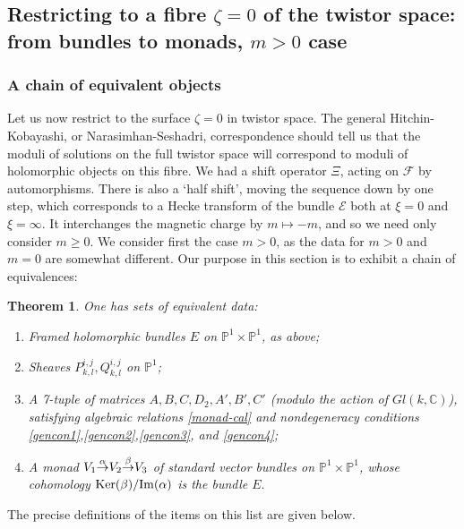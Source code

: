 \documentclass[12pt]{article}
\newtheorem{theorem}{Theorem}[section]
\theoremstyle{definition}
\theoremstyle{remark}
\numberwithin{theorem}{section}
\def\bC{{\mathbb {C}}}
\def\bP{{\mathbb {P}}}
\def\pE{{\mathcal E}}
\def\pF{{\mathcal F}}
\renewcommand{\ker}{\mathop{\mathrm{Ker}}\nolimits}
\begin{document}
 


\subsection{Restricting to a fibre $\zeta = 0$ of the twistor space: from bundles to monads, $m>0$ case}

\subsubsection{A chain of equivalent objects}

Let us now restrict to the surface $\zeta = 0$ in twistor space. The general Hitchin-Kobayashi, or Narasimhan-Seshadri, correspondence should tell us that the moduli of solutions on the full twistor space will correspond to moduli of holomorphic objects on this fibre. We had a shift operator $\Xi$, acting on $\pF$ by automorphisms. There is also a `half shift', moving the sequence down by one step, which corresponds to a Hecke transform of the bundle $\pE$ both at $\xi = 0$ and $\xi=\infty$. It interchanges the magnetic charge by $m\mapsto -m$, and so we need only consider $m\geq 0$. We consider first  the case $m>0$, as the data for $m>0$ and $m=0$  are somewhat different. 
 Our purpose in this section is to exhibit a chain of equivalences:

\begin{theorem} \cite{Charbonneau:2006gu,Charbonneau:2007zd,Nye-Singer} One has sets of equivalent data:
\begin{enumerate}
\item Framed holomorphic bundles $E$ on $\bP^1\times \bP^1$, as above;
\item Sheaves $P^{i,j}_{k,l}, Q^{i,j}_{k,l}$ on $\bP^1$;
\item  A 7-tuple of matrices $A, B, C, D_2, A',B',C'$ (modulo the action of $Gl(k,\bC)$), satisfying algebraic relations \eqref{monad-cal} and nondegeneracy conditions \eqref{gencon1},\eqref{gencon2},\eqref{gencon3}, and \eqref{gencon4};
\item  A monad $ V_1 {\buildrel{\alpha }\over{\rightarrow} }V_2 {\buildrel{\beta}\over{\rightarrow}}  V_3$ of standard vector bundles on $\bP^1\times \bP^1$, whose cohomology $\ker( \beta)/{\rm {Im}}(\alpha)$ is the bundle $E.$
\end{enumerate}

\end{theorem}

The precise definitions of the items on this list are given below.
\end{document}
